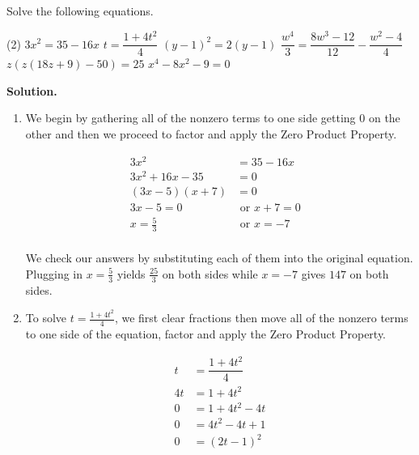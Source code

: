\begin{ex}\label{solveeqnbyfactoring}  Solve the following equations.

\begin{tasks}(2)
\task  $3x^2 = 35 - 16x$
\task  $t = \dfrac{1+4t^2}{4}$
\task  $(y-1)^2 = 2(y-1)$
\task  $\dfrac{w^4}{3} = \dfrac{8w^3-12}{12} - \dfrac{w^2-4}{4}$
\task  $z(z(18z+9)-50) = 25$
\task  $x^4-8x^2 - 9 = 0$
\end{tasks}

{\bf Solution.}

\begin{enumerate}

\item  We begin by gathering all of the nonzero terms to one side getting $0$ on the other and then we proceed to factor and apply the Zero Product Property.

\begin{align*}
3x^2 & = 35 - 16x \\
3x^2 + 16x - 35 & = 0 \tag{Add $16x$, subtract $35$} \\
(3x-5)(x+7) & = 0 \tag{Factor} \\
3x-5 = 0 & \text{ or } x+7 = 0 \tag{Zero Product Property} \\
x = \frac{5}{3} & \text{ or } x = -7 & \\ 
\end{align*}

We check our answers by substituting each of them into the original equation.  Plugging in $x = \frac{5}{3}$ yields $\frac{25}{3}$ on both sides while $x = -7$ gives $147$ on both sides.

\item To solve $t = \frac{1+4t^2}{4}$, we first clear fractions then move all of the nonzero terms to one side of the equation, factor and apply the Zero Product Property.

\begin{align*}
t & = \dfrac{1+4t^2}{4} \\
4t & = 1+4t^2 \tag{Clear fractions (multiply by $4$)} \\
0 & = 1+4t^2 - 4t \tag{Subtract 4} \\
0 & = 4t^2 - 4t + 1 \tag{Rearrange terms} \\
0 & = (2t-1)^2 \tag{Factor\textemdash Perfect Square Trinomial)} \\
\end{align*}


\end{enumerate}
\end{ex}
